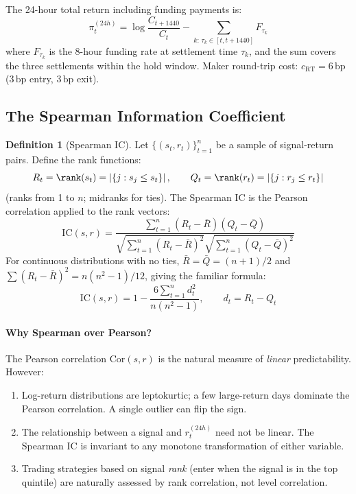 \documentclass[12pt, a4paper]{article}
\theoremstyle{plain}
\theoremstyle{definition}
\newtheorem{definition}{Definition}[section]
\newcommand{\IC}{\mathrm{IC}}
\newcommand{\Cor}{\mathrm{Cor}}
\newcommand{\bp}{\,\mathrm{bp}}
\begin{document}
The 24-hour total return including funding payments is:
\begin{equation}
  \pi_t^{(24h)} = \log\frac{C_{t+1440}}{C_t}
                  - \sum_{k:\,\tau_k \in [t, t+1440]} F_{\tau_k}
\end{equation}
where $F_{\tau_k}$ is the 8-hour funding rate at settlement time $\tau_k$,
and the sum covers the three settlements within the hold window.
Maker round-trip cost: $c_{\mathrm{RT}} = 6\bp$ ($3\bp$ entry, $3\bp$ exit).

\subsection{The Spearman Information Coefficient}
\label{sec:IC}

\begin{definition}[Spearman IC]
  Let $\{(s_t, r_t)\}_{t=1}^n$ be a sample of signal-return pairs.
  Define the rank functions:
  \[
    R_t = \rank(s_t) = \left|\{j : s_j \leq s_t\}\right|, \qquad
    Q_t = \rank(r_t) = \left|\{j : r_j \leq r_t\}\right|
  \]
  (ranks from 1 to $n$; midranks for ties).  The Spearman IC is the Pearson
  correlation applied to the rank vectors:
  \begin{equation}
    \IC(s, r) = \frac{\sum_{t=1}^n (R_t - \bar{R})(Q_t - \bar{Q})}
                     {\sqrt{\sum_{t=1}^n (R_t - \bar{R})^2}
                      \sqrt{\sum_{t=1}^n (Q_t - \bar{Q})^2}}
    \label{eq:spearman}
  \end{equation}
  For continuous distributions with no ties, $\bar{R} = \bar{Q} = (n+1)/2$
  and $\sum (R_t - \bar{R})^2 = n(n^2-1)/12$, giving the familiar formula:
  \[
    \IC(s, r) = 1 - \frac{6\sum_{t=1}^n d_t^2}{n(n^2 - 1)},
    \qquad d_t = R_t - Q_t
  \]
\end{definition}

\paragraph{Why Spearman over Pearson?}
The Pearson correlation $\Cor(s, r)$ is the natural measure of
\emph{linear} predictability.  However:
\begin{enumerate}[noitemsep]
  \item Log-return distributions are leptokurtic; a few large-return days
        dominate the Pearson correlation.  A single outlier can flip the sign.
  \item The relationship between a signal and $r_t^{(24h)}$ need not be
        linear.  The Spearman IC is invariant to any monotone transformation
        of either variable.
  \item Trading strategies based on signal \emph{rank} (enter when the signal
        is in the top quintile) are naturally assessed by rank correlation,
        not level correlation.
\end{enumerate}
\end{document}
